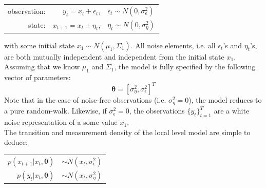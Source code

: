 \documentclass[11pt, oneside]{scrreprt}   	%
\begin{document}
\begin{center}
\begin{tabular}{ r r l }
  observation: & $y_t = x_t + \epsilon_t$, & $\epsilon_t \sim N(0,\sigma_{\epsilon}^2)$ \\
  state: & $x_{t+1} = x_t + \eta_t$, & $\eta_t \sim N(0,\sigma_{\eta}^2)$ \\
\end{tabular}
\end{center}
\bigskip
with some initial state $x_1 \sim N(\mu_1, \Sigma_1)$. All noise elements, i.e. all $\epsilon_t$'s and $\eta_t$'s, are both mutually independent and independent from the initial state $x_1$. Assuming that we know $\mu_1$ and $\Sigma_1$, the model is fully specified by the following vector of parameters:
$$
\boldsymbol{\theta} = [\sigma_{\eta}^2,  \sigma_{\epsilon}^2]^T
$$
Note that in the case of noise-free observations (i.e. $\sigma_{\eta}^2 = 0$), the model reduces to a pure random-walk. Likewise, if $\sigma_{\epsilon}^2 = 0$, the observations $\{y_t\}_{t=1}^T$ are a white noise representation of a some value $x_1$.\\
The transition and measurement density of the local level model are simple to deduce:
\begin{center}
\begin{tabular}{ r l }
  $p(x_{t+1} | x_t, \boldsymbol{\theta})$ & $\sim N(x_t,\sigma_{\epsilon}^2)$ \\
  $p(y_t | x_t, \boldsymbol{\theta})$ & $\sim N(x_t,\sigma_{\eta}^2)$ \\
\end{tabular}
\end{center}
\bigskip

\end{document}
